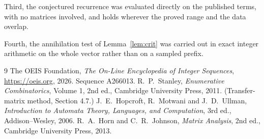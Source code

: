 \documentclass[11pt,a4paper]{article}
\theoremstyle{plain}
\theoremstyle{definition}
\begin{document}
Third, the conjectured recurrence was evaluated directly on the published terms, with no
matrices involved, and holds wherever the proved range and the data overlap.

Fourth, the annihilation test of Lemma~\ref{lem:crit} was carried out in exact integer
arithmetic on the whole vector rather than on a sampled prefix.

\begin{thebibliography}{9}
 The OEIS Foundation, \emph{The On-Line Encyclopedia of Integer
Sequences}, \url{https://oeis.org}, 2026. Sequence A266013.
 R.~P.~Stanley, \emph{Enumerative Combinatorics}, Volume 1, 2nd ed.,
Cambridge University Press, 2011. (Transfer-matrix method, Section 4.7.)
 J.~E.~Hopcroft, R.~Motwani and J.~D.~Ullman, \emph{Introduction to Automata
Theory, Languages, and Computation}, 3rd ed., Addison--Wesley, 2006.
 R.~A.~Horn and C.~R.~Johnson, \emph{Matrix Analysis}, 2nd ed., Cambridge
University Press, 2013.
\end{thebibliography}
\end{document}
